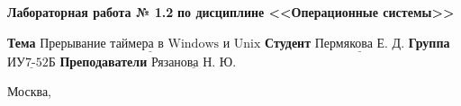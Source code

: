 \vspace{1cm}

\begin{center}
	\noindent\begin{minipage}{1.3\textwidth}\centering
		\Large\textbf{  Лабораторная работа № 1.2}\newline
		\textbf{по дисциплине <<Операционные системы>>}\newline\newline
	\end{minipage}
\end{center}

\noindent\textbf{Тема} $\underline{\text{Прерывание таймера в Windows и Unix}}$\newline\newline
\noindent\textbf{Студент} $\underline{\text{Пермякова Е. Д.}}$\newline\newline
\noindent\textbf{Группа} $\underline{\text{ИУ7-52Б}}$\newline\newline
\noindent\textbf{Преподаватели} $\underline{\text{Рязанова Н. Ю.}}$\newline

\begin{center}
	\vfill
	Москва,~\the\year
\end{center}
\clearpage
